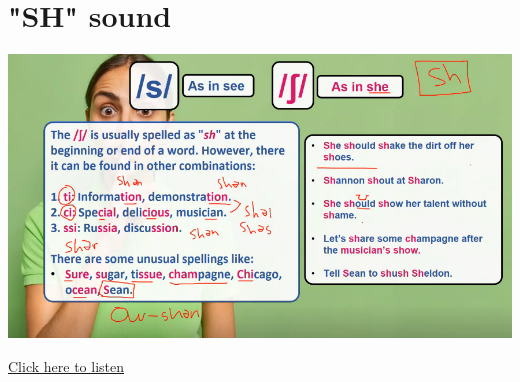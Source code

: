 \section{"SH" sound \textipa{/\textesh/}}
\begin{center}
\includegraphics[width=1\textwidth]{images/sh_portrait.png}
\end{center}

\href{https://drive.google.com/file/d/18J6AvoCQcRX4x2EfFuk6YyZnvlKzgbea/view?usp=drive_link}{Click here to listen}

